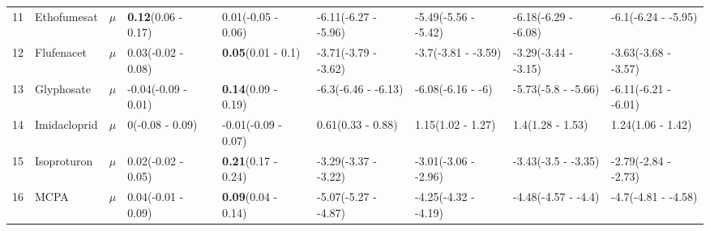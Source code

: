 \begin{longtable}{lp{2cm}p{0.6cm}p{1.8cm}p{1.8cm}p{1.8cm}p{1.8cm}p{1.8cm}p{1.8cm}}
  11 & Ethofumesat & $\mu$ & \textbf{0.12}\newline (0.06 - 0.17) & 0.01\newline (-0.05 - 0.06) & -6.11\newline (-6.27 - -5.96) & -5.49\newline (-5.56 - -5.42) & -6.18\newline (-6.29 - -6.08) & -6.1\newline (-6.24 - -5.95) \\ 
  12 & Flufenacet & $\mu$ & 0.03\newline (-0.02 - 0.08) & \textbf{0.05}\newline (0.01 - 0.1) & -3.71\newline (-3.79 - -3.62) & -3.7\newline (-3.81 - -3.59) & -3.29\newline (-3.44 - -3.15) & -3.63\newline (-3.68 - -3.57) \\ 
  13 & Glyphosate & $\mu$ & -0.04\newline (-0.09 - 0.01) & \textbf{0.14}\newline (0.09 - 0.19) & -6.3\newline (-6.46 - -6.13) & -6.08\newline (-6.16 - -6) & -5.73\newline (-5.8 - -5.66) & -6.11\newline (-6.21 - -6.01) \\ 
  14 & Imidacloprid & $\mu$ & 0\newline (-0.08 - 0.09) & -0.01\newline (-0.09 - 0.07) & 0.61\newline (0.33 - 0.88) & 1.15\newline (1.02 - 1.27) & 1.4\newline (1.28 - 1.53) & 1.24\newline (1.06 - 1.42) \\ 
  15 & Isoproturon & $\mu$ & 0.02\newline (-0.02 - 0.05) & \textbf{0.21}\newline (0.17 - 0.24) & -3.29\newline (-3.37 - -3.22) & -3.01\newline (-3.06 - -2.96) & -3.43\newline (-3.5 - -3.35) & -2.79\newline (-2.84 - -2.73) \\ 
  16 & MCPA & $\mu$ & 0.04\newline (-0.01 - 0.09) & \textbf{0.09}\newline (0.04 - 0.14) & -5.07\newline (-5.27 - -4.87) & -4.25\newline (-4.32 - -4.19) & -4.48\newline (-4.57 - -4.4) & -4.7\newline (-4.81 - -4.58) \\ 

\end{longtable}
